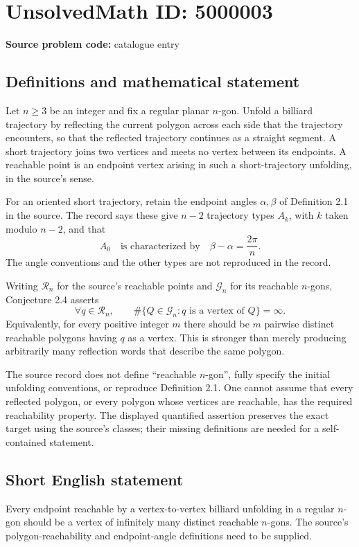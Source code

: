 \documentclass[11pt]{article}
\begin{document}
\section*{UnsolvedMath ID: 5000003}
\textbf{Source problem code:} catalogue entry
\subsection{Definitions and mathematical statement}
Let $n\geq3$ be an integer and fix a regular planar $n$-gon. Unfold a billiard trajectory by reflecting the current polygon across each side that the trajectory encounters, so that the reflected trajectory continues as a straight segment. A short trajectory joins two vertices and meets no vertex between its endpoints. A reachable point is an endpoint vertex arising in such a short-trajectory unfolding, in the source's sense.

For an oriented short trajectory, retain the endpoint angles $\alpha,\beta$ of Definition 2.1 in the source. The record says these give $n-2$ trajectory types $A_k$, with $k$ taken modulo $n-2$, and that
\[
A_0\quad\text{is characterized by}\quad\beta-\alpha=\frac{2\pi}{n}.
\]
The angle conventions and the other types are not reproduced in the record.

Writing $\mathcal R_n$ for the source's reachable points and $\mathcal G_n$ for its reachable $n$-gons, Conjecture 2.4 asserts
\[
\forall q\in\mathcal R_n,\qquad
\#\{Q\in\mathcal G_n:q\text{ is a vertex of }Q\}=\infty.
\]
Equivalently, for every positive integer $m$ there should be $m$ pairwise distinct reachable polygons having $q$ as a vertex. This is stronger than merely producing arbitrarily many reflection words that describe the same polygon.

The source record does not define ``reachable $n$-gon'', fully specify the initial unfolding conventions, or reproduce Definition 2.1. One cannot assume that every reflected polygon, or every polygon whose vertices are reachable, has the required reachability property. The displayed quantified assertion preserves the exact target using the source's classes; their missing definitions are needed for a self-contained statement.
\subsection{Short English statement}
Every endpoint reachable by a vertex-to-vertex billiard unfolding in a regular $n$-gon should be a vertex of infinitely many distinct reachable $n$-gons. The source's polygon-reachability and endpoint-angle definitions need to be supplied.
\end{document}
